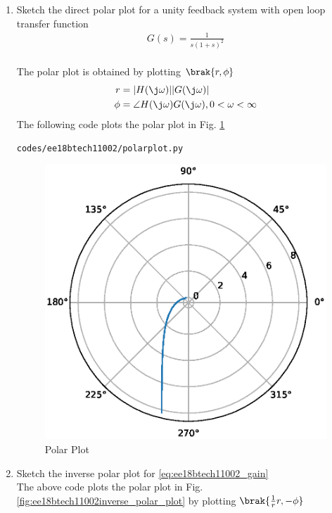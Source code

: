 \begin{enumerate}[label=\thesection.\arabic*.,ref=\thesection.\theenumi]
\item Sketch the direct polar plot for a unity feedback system with open loop transfer function
\begin{align}
\label{eq:ee18btech11002_gain}
G(s) = \frac{1}{s(1+s)^2}
\end{align}
\\
\solution  
The polar plot is obtained by plotting $\brak{r,\phi}$
\begin{align}
r&=|H(\j\omega)||G(\j\omega)|
\\
\phi&=\angle H(\j\omega)G(\j\omega), 0 < \omega < \infty
\end{align}
The following code plots the polar plot in Fig. \ref{fig:ee18btech11002polar_plot}

\begin{lstlisting}
codes/ee18btech11002/polarplot.py
\end{lstlisting}
\begin{figure}[!ht]
\centering
\includegraphics[width=\columnwidth]{./figs/ee18btech11002/ee18btech11002.eps}
\caption{Polar Plot}
\label{fig:ee18btech11002polar_plot}
\end{figure}
\item Sketch the inverse polar plot for \eqref{eq:ee18btech11002_gain}
\\
\solution The above code plots the polar plot in Fig. \ref{fig:ee18btech11002inverse_polar_plot} by plotting  $\brak{\frac{1}{r}r,-\phi}$


\end{enumerate}
